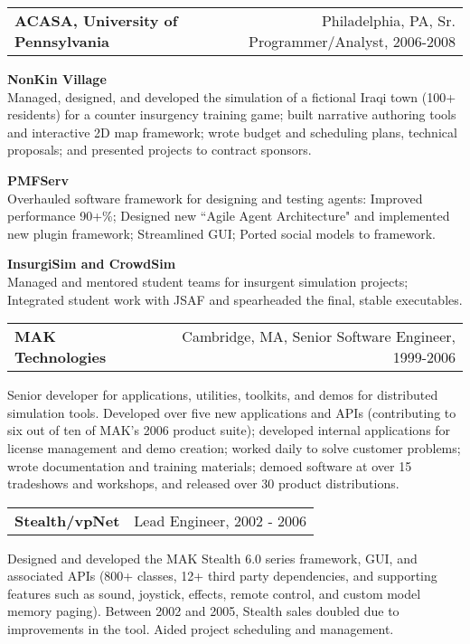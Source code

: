 \medskip

\needspace{6em}
\begin{tabular*}{7.1in}{@{}l@{\extracolsep\fill}r}
{\large {\bf ACASA, University of Pennsylvania}} & Philadelphia, PA, Sr. Programmer/Analyst, 2006-2008\\
\end{tabular*}

{\bf NonKin Village}\\
Managed, designed, and developed the simulation of a fictional Iraqi town (100+ residents) for a counter insurgency training game; built narrative authoring tools and interactive 2D map framework; wrote budget and scheduling plans, technical proposals; and presented projects to contract sponsors.

{\bf PMFServ}\\
Overhauled software framework for designing and testing agents: Improved performance 90+\%; Designed new ``Agile Agent Architecture" and implemented new plugin framework; Streamlined GUI; Ported social models to framework.

{\bf InsurgiSim and CrowdSim}\\
Managed and mentored student teams for insurgent simulation projects; Integrated student work with JSAF and spearheaded the final, stable executables. 

\medskip
\medskip

\needspace{6em}
\begin{tabular*}{7.1in}{@{}l@{\extracolsep\fill}r}
{\large {\bf MAK Technologies}} & Cambridge, MA, Senior Software Engineer, 1999-2006\\
\end{tabular*}

Senior developer for applications, utilities, toolkits, and demos for distributed simulation tools.  Developed over five new applications and APIs (contributing to six out of ten of MAK's 2006 product suite); developed internal applications for license management and demo creation; worked daily to solve customer problems; wrote documentation and training materials; demoed software at over 15 tradeshows and workshops, and released over 30 product distributions. 

\medskip
\needspace{6em}
\begin{tabular*}{7.1in}{@{}l@{\extracolsep\fill}r}
{\bf Stealth/vpNet} & Lead Engineer, 2002 - 2006\\
\end{tabular*}
Designed and developed the MAK Stealth 6.0 series framework, GUI, and associated APIs (800+ classes, 12+ third party dependencies, and supporting features such as sound, joystick, effects, remote control, and custom model memory paging).  Between 2002 and 2005, Stealth sales doubled due to improvements in the tool. Aided project scheduling and management.

